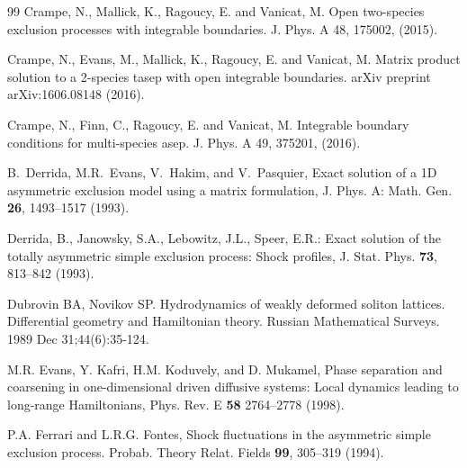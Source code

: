 \documentclass[12pt]{article}
\begin{document}
\begin{thebibliography}{99}
Crampe, N., Mallick, K., Ragoucy, E. and Vanicat, M. 
Open two-species exclusion processes with integrable boundaries. 
J. Phys. A 48, 175002, (2015).

Crampe, N., Evans, M., Mallick, K., Ragoucy, E. and Vanicat, M. 
Matrix product solution to a 2-species tasep with open integrable boundaries. arXiv preprint arXiv:1606.08148 (2016).

Crampe, N., Finn, C., Ragoucy, E. and Vanicat, M. 
Integrable boundary conditions for multi-species asep. 
J. Phys. A 49, 375201, (2016).


B.~Derrida, M.R.~Evans, V.~Hakim, and V.~Pasquier,
Exact solution of a 1D asymmetric exclusion model using a matrix formulation,
J. Phys. A: Math. Gen. \textbf{26}, 1493--1517 (1993).

Derrida, B., Janowsky, S.A., Lebowitz, J.L., Speer, E.R.: 
Exact solution of the totally asymmetric simple exclusion process: Shock profiles, 
J. Stat. Phys. \textbf{73}, 813--842 (1993).

%


Dubrovin BA, Novikov SP. Hydrodynamics of weakly deformed soliton lattices. Differential geometry and Hamiltonian theory. Russian Mathematical Surveys. 1989 Dec 31;44(6):35-124.

M.R. Evans,  Y. Kafri, H.M. Koduvely, and D. Mukamel,
Phase separation and coarsening in one-dimensional driven diffusive 
systems: Local dynamics leading to long-range Hamiltonians,
Phys. Rev. E {\bf 58} 2764--2778 (1998).

P.A. Ferrari and L.R.G. Fontes, 
Shock fluctuations in the asymmetric simple exclusion process.
Probab. Theory Relat. Fields \textbf{99}, 305--319 (1994).


\end{thebibliography}
\end{document}
